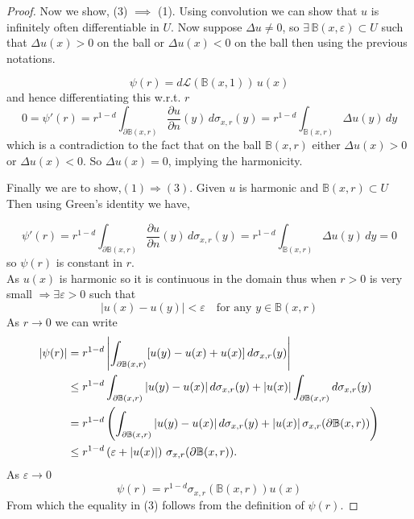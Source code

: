 \documentclass{article}
\numberwithin{equation}{section}
\begin{document}
\begin{proof}
\noindent Now we show, (3) \(\implies\) (1). Using convolution we can show that \( u \) is infinitely often differentiable in \( U \). Now suppose \( \Delta u \ne 0 \), so \( \exists \, \mathbb{B}(x, \varepsilon) \subset U \) such that \( \Delta u(x) > 0 \) on the ball or \( \Delta u(x) < 0 \) on the ball then 
using the previous notations.

\[
\psi(r) = d\mathscr{L}(\mathbb{B}(x,1)) \, u(x)
\]
and hence differentiating this w.r.t. \( r \)
\[
0 = \psi'(r) = r^{1-d} \int_{\partial \mathbb{B}(x,r)} \frac{\partial u}{\partial n}(y) \, d\sigma_{x,r}(y)
= r^{1-d} \int_{\mathbb{B}(x,r)} \Delta u(y) \, dy
\]
\noindent which is a contradiction to the fact that 
on the ball \( \mathbb{B}(x,r) \) either \( \Delta u(x) > 0 \) or 
\( \Delta u(x) < 0 \). So \( \Delta u(x) = 0 \), implying the harmonicity.

\noindent Finally we are to show,\(
(1) \Rightarrow (3)
\). 
\noindent  Given \( u \) is harmonic and \( \mathbb{B}(x, r) \subset U \) \\
Then using Green's identity we have,

\[
\psi'(r) = r^{1-d} \int_{\partial \mathbb{B}(x,r)} \frac{\partial u}{\partial n}(y) \, d\sigma_{x,r}(y) = r^{1-d} \int_{\mathbb{B}(x,r)} \Delta u(y) \, dy = 0
\]
\noindent so \( \psi(r) \) is constant in \( r \). \\
As \( u(x) \) is harmonic so it is continuous in the domain thus when \( r > 0 \) is very small \( \Rightarrow \exists \varepsilon >0 \) such that
\[
|u(x) - u(y)| < \varepsilon \quad \text{for any } y \in \mathbb{B}(x,r)
\]
As \(r \to 0\) we can write
\begin{align*}
|\psi(r)| 
&= r^{1-d} \left| \int_{\partial \mathbb{B}(x,r)} [u(y) - u(x) + u(x)] \, d\sigma_{x,r}(y) \right| \notag \\
&\leq r^{1-d} \int_{\partial \mathbb{B}(x,r)} |u(y) - u(x)| \, d\sigma_{x,r}(y) 
+ |u(x)| \int_{\partial \mathbb{B}(x,r)} d\sigma_{x,r}(y) \notag \\
&= r^{1-d} \left( \int_{\partial \mathbb{B}(x,r)} |u(y) - u(x)| \, d\sigma_{x,r}(y) 
+ |u(x)| \, \sigma_{x,r}(\partial \mathbb{B}(x,r)) \right) \notag \\
&\leq r^{1-d} \left( \varepsilon + |u(x)| \right) \, \sigma_{x,r}(\partial \mathbb{B}(x,r)).
\end{align*}
\noindent As \(\varepsilon \to 0\)
\[
\psi(r)= r^{1-d} \sigma_{x,r}(\mathbb{B}(x,r)) u(x)
\]
From which the equality in (3) follows from the definition of \(\psi(r)\).


\end{proof}
\end{document}
